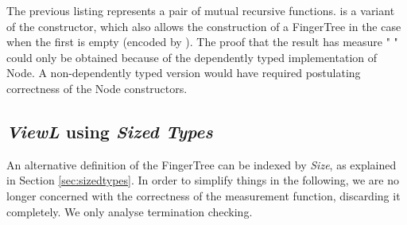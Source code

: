 \documentclass[12pt,twoside,notitlepage]{report}
\begin{document}
The previous listing represents a pair of mutual recursive functions.  is a variant of the  constructor, which also allows the construction of a FingerTree in the case when the first  is empty (encoded by ). The proof that the result has measure "      " could only be obtained because of the dependently typed implementation of Node. A non-dependently typed version would have required postulating correctness of the Node constructors. 


\subsection{\textit{ViewL} using \textit{Sized Types}}
\label{sec:viewLsize}
An alternative definition of the FingerTree can be indexed by \textit{Size}, as explained in Section \ref{sec:sizedtypes}. In order to simplify things in the following, we are no longer concerned with the correctness of the measurement function, discarding it completely. We only analyse termination checking.

\begin{code}
\\
\>  \AgdaSymbol{\{} \AgdaSymbol{:} \AgdaSymbol{\}} \AgdaSymbol{(} \AgdaSymbol{:}  \AgdaSymbol{)} \AgdaSymbol{:} \AgdaSymbol{\{} \AgdaSymbol{:} \AgdaSymbol{\}}    \<%
\\
\>[0]\<[2]%
\>[2] \<[9]%
\>[9]\AgdaSymbol{:} \AgdaSymbol{\{} \AgdaSymbol{:} \AgdaSymbol{\}}    \AgdaSymbol{\{} \AgdaSymbol{\}}\<%
\\
\>[0]\<[2]%
\>[2] \AgdaSymbol{:} \AgdaSymbol{\{} \AgdaSymbol{:} \AgdaSymbol{\}}      \AgdaSymbol{\{} \AgdaSymbol{\}}\<%
\\
\>[0]\<[2]%
\>[2] \<[9]%
\>[9]\AgdaSymbol{:} \AgdaSymbol{\{} \AgdaSymbol{:} \AgdaSymbol{\}}      \AgdaSymbol{(} \AgdaSymbol{)} \AgdaSymbol{\{}\AgdaSymbol{\}}    \<%
\\
\>[2]\<[11]%
\>[11]  \AgdaSymbol{\{} \AgdaSymbol{\}}\<%
\\
\end{code} 
\end{document}
